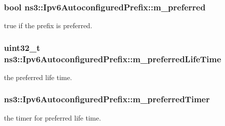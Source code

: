 \subsubsection[{\texorpdfstring{m\+\_\+preferred}{m_preferred}}]{\setlength{\rightskip}{0pt plus 5cm}bool ns3\+::\+Ipv6\+Autoconfigured\+Prefix\+::m\+\_\+preferred\hspace{0.3cm}{\ttfamily [private]}}\hypertarget{classns3_1_1Ipv6AutoconfiguredPrefix_a805d0d90768052ce0e595086d8189ee0}{}\label{classns3_1_1Ipv6AutoconfiguredPrefix_a805d0d90768052ce0e595086d8189ee0}


true if the prefix is preferred. 

\subsubsection[{\texorpdfstring{m\+\_\+preferred\+Life\+Time}{m_preferredLifeTime}}]{\setlength{\rightskip}{0pt plus 5cm}uint32\+\_\+t ns3\+::\+Ipv6\+Autoconfigured\+Prefix\+::m\+\_\+preferred\+Life\+Time\hspace{0.3cm}{\ttfamily [private]}}\hypertarget{classns3_1_1Ipv6AutoconfiguredPrefix_a4a1f65162a9458488684666ce873e512}{}\label{classns3_1_1Ipv6AutoconfiguredPrefix_a4a1f65162a9458488684666ce873e512}


the preferred life time. 

\subsubsection[{\texorpdfstring{m\+\_\+preferred\+Timer}{m_preferredTimer}}]{ ns3\+::\+Ipv6\+Autoconfigured\+Prefix\+::m\+\_\+preferred\+Timer\hspace{0.3cm}{\ttfamily [private]}}\hypertarget{classns3_1_1Ipv6AutoconfiguredPrefix_aae5e90506ba2dc7168bbf814634fca6a}{}\label{classns3_1_1Ipv6AutoconfiguredPrefix_aae5e90506ba2dc7168bbf814634fca6a}


the timer for preferred life time. 


